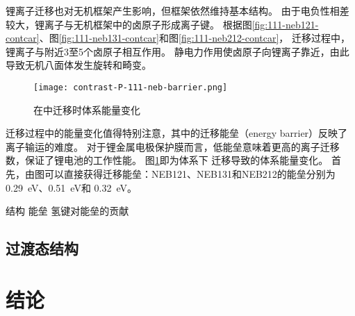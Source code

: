 锂离子迁移也对无机框架产生影响，但框架依然维持基本结构。
由于电负性相差较大，锂离子与无机框架中的卤原子形成离子键。
根据图\ref{fig:111-neb121-contcar}、图\ref{fig:111-neb131-contcar}和图\ref{fig:111-neb212-contcar}，
迁移过程中，锂离子与附近3至5个卤原子相互作用。
静电力作用使卤原子向锂离子靠近，由此导致无机八面体发生旋转和畸变。

\begin{figure}[htbp]
    \centering
    \texttt{[image: contrast-P-111-neb-barrier.png]}
    \caption{在中迁移时体系能量变化}
    \label{fig:111-barrier}
\end{figure}

迁移过程中的能量变化值得特别注意，其中的迁移能垒（energy barrier）反映了离子输运的难度。
对于锂金属电极保护膜而言，低能垒意味着更高的离子迁移数，保证了锂电池的工作性能。
图\ref{fig:111-barrier}即为体系下 迁移导致的体系能量变化。
首先，由图可以直接获得迁移能垒：NEB121、NEB131和NEB212的能垒分别为 \SI{0.29}{eV}、\SI{0.51}{eV}和 \SI{0.32}{eV}。

结构
能垒
氢键对能垒的贡献

\subsection{过渡态结构}

\section{结论}